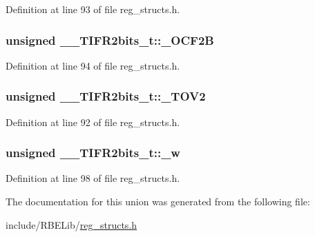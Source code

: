Definition at line 93 of file reg\+\_\+structs.\+h.

\hypertarget{union_____t_i_f_r2bits__t_afa2d8e193385142d74e6c9451a0b1af9}{
\subsubsection[{\+\_\+\+O\+C\+F2\+B}]{\setlength{\rightskip}{0pt plus 5cm}unsigned \+\_\+\+\_\+\+T\+I\+F\+R2bits\+\_\+t\+::\+\_\+\+O\+C\+F2\+B}}\label{union_____t_i_f_r2bits__t_afa2d8e193385142d74e6c9451a0b1af9}


Definition at line 94 of file reg\+\_\+structs.\+h.

\hypertarget{union_____t_i_f_r2bits__t_a8d2d3d63bb9064fd6b07d75875218d34}{
\subsubsection[{\+\_\+\+T\+O\+V2}]{\setlength{\rightskip}{0pt plus 5cm}unsigned \+\_\+\+\_\+\+T\+I\+F\+R2bits\+\_\+t\+::\+\_\+\+T\+O\+V2}}\label{union_____t_i_f_r2bits__t_a8d2d3d63bb9064fd6b07d75875218d34}


Definition at line 92 of file reg\+\_\+structs.\+h.

\hypertarget{union_____t_i_f_r2bits__t_a08e241120284ad21d1a2891dbc90b052}{
\subsubsection[{\+\_\+w}]{\setlength{\rightskip}{0pt plus 5cm}unsigned \+\_\+\+\_\+\+T\+I\+F\+R2bits\+\_\+t\+::\+\_\+w}}\label{union_____t_i_f_r2bits__t_a08e241120284ad21d1a2891dbc90b052}


Definition at line 98 of file reg\+\_\+structs.\+h.



The documentation for this union was generated from the following file\+:\begin{DoxyCompactItemize}
\item 
include/\+R\+B\+E\+Lib/\hyperlink{reg__structs_8h}{reg\+\_\+structs.\+h}\end{DoxyCompactItemize}
